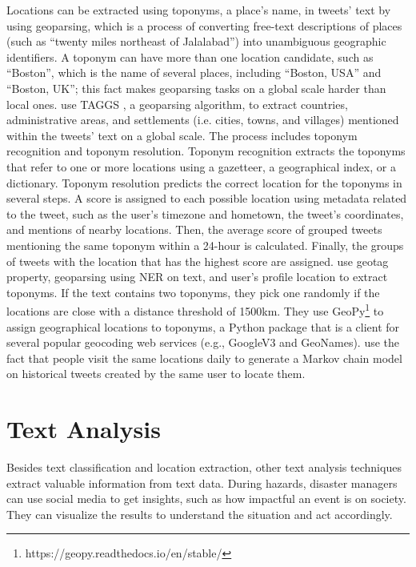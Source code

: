 Locations can be extracted using toponyms, a place's name, in tweets' text by using geoparsing,
which is a process of converting free-text descriptions of places (such as ``twenty miles northeast
of Jalalabad'') into unambiguous geographic identifiers. A toponym can have more than one location
candidate, such as ``Boston'', which is the name of several places, including ``Boston, USA'' and
``Boston, UK''; this fact makes geoparsing tasks on a global scale harder than local ones.
 use TAGGS \cite{debruijnTAGGSGroupingTweets2017}, a
geoparsing algorithm, to extract countries, administrative areas, and settlements (i.e. cities,
towns, and villages) mentioned within the tweets' text on a global scale. The process includes
toponym recognition and toponym resolution. Toponym recognition extracts the toponyms that refer to
one or more locations using a gazetteer, a geographical index, or a dictionary. Toponym resolution
predicts the correct location for the toponyms in several steps. A score is assigned to each
possible location using metadata related to the tweet, such as the user's timezone and hometown, the
tweet's coordinates, and mentions of nearby locations. Then, the average score of grouped tweets
mentioning the same toponym within a 24-hour is calculated. Finally, the groups of tweets with the
location that has the highest score are assigned.
 use geotag property, geoparsing using
\ac{NER} on text, and user's profile location to extract toponyms. If the text contains two
toponyms, they pick one randomly if the locations are close with a distance threshold of 1500km.
They use GeoPy\footnote{https://geopy.readthedocs.io/en/stable/} to assign geographical locations to
toponyms, a Python package that is a client for several popular geocoding web services (e.g.,
GoogleV3 and GeoNames).  use the fact that people
visit the same locations daily to generate a Markov chain model on historical tweets created by the
same user to locate them. 

\section{Text Analysis}

Besides text classification and location extraction, other text analysis techniques extract valuable
information from text data. During hazards, disaster managers can use social media to get insights,
such as how impactful an event is on society. They can visualize the results to understand the
situation and act accordingly. 

